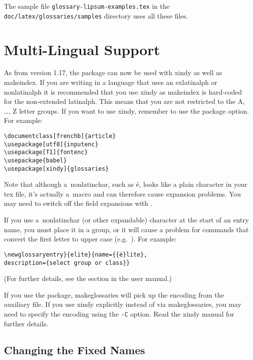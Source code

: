 \documentclass[report,inlinetitle]{nlctdoc}
\newcounter{sample}
\begin{document}
The sample file \texttt{glossary-lipsum-examples.tex} in the 
\texttt{doc\slash latex\slash glossaries\slash samples} directory
uses all these files.

\section{Multi-Lingual Support}
\label{sec:languages}

As from version 1.17, the  package can now be
used with \gls{xindy} as well as \gls{makeindex}. If you
are writing in a language that uses an \gls{exlatinalph} or
\gls{nonlatinalph} it is recommended that you use \gls*{xindy}
as \gls*{makeindex} is hard-coded for the non-extended
\gls{latinalph}. This
means that you are not restricted to the A, \ldots, Z letter groups.
If you want to use \gls*{xindy}, remember to use the
 package option. For example:
\begin{verbatim}
\documentclass[frenchb]{article}
\usepackage[utf8]{inputenc}
\usepackage[T1]{fontenc}
\usepackage{babel}
\usepackage[xindy]{glossaries}
\end{verbatim}

\begin{important}
Note that although a~\gls{nonlatinchar}, such as \'e, looks like a plain
character in your tex file, it's actually a~macro and can therefore
cause expansion problems. You may need to switch off the field
expansions with .

If you use a~\gls{nonlatinchar} (or other expandable) character at the start of
an entry name, you must place it in a group, or it will cause
a problem for commands that convert the first letter to upper case
(e.g.\ ). For example:
\begin{alltt}
\verb|\newglossaryentry}{elite}{name={{|\'e\verb|}lite},|
description=\verb|{select group or class}}|
\end{alltt}
\end{important}
(For further details, see the section
 in the
 user manual.)

If you use the  package, \gls{makeglossaries}
will pick up the encoding from the auxiliary file. If you use
\gls{xindy} explicitly instead of via \gls*{makeglossaries},
you may need to specify the encoding using the \texttt{-C} 
option. Read the \gls*{xindy} manual for further details.

\subsection{Changing the Fixed Names}
\label{sec:fixednames}
\end{document}
